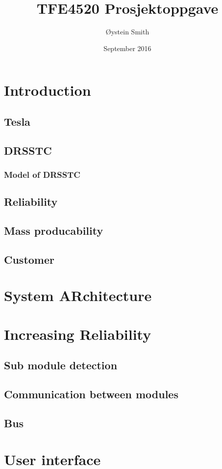 \documentclass{article}
\title{TFE4520 Prosjektoppgave}
\author{Øystein Smith}
\date{September 2016}
\begin{document}
\maketitle

\section{Introduction}
\subsection{Tesla}
\subsection{DRSSTC}
\subsubsection{Model of DRSSTC}
\subsection{Reliability}
\subsection{Mass producability}
\subsection{Customer}

\section{System ARchitecture}
\section{Increasing Reliability}
\subsection{Sub module detection}
\subsection{Communication between modules}
\subsection{Bus}
\section{User interface}
\end{document}
